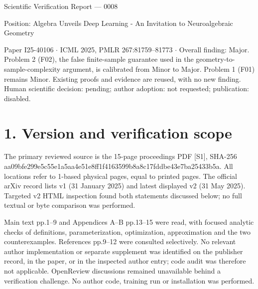 \documentclass[10pt]{article}
\begin{document}
Scientific Verification Report — 0008\par
Position: Algebra Unveils Deep Learning - An Invitation to Neuroalgebraic Geometry\par
Paper I25-40106 \(\cdot\) ICML 2025, PMLR 267:81759–81773 \(\cdot\) Overall finding: Major. Problem 2 (F02), the false finite-sample guarantee used in the geometry-to-sample-complexity argument, is calibrated from Minor to Major. Problem 1 (F01) remains Minor. Existing proofs and evidence are reused, with no new finding. Human scientific decision: pending; author adoption: not requested; publication: disabled.\par
\section*{1. Version and verification scope}
The primary reviewed source is the 15-page proceedings PDF [S1], SHA-256 aa09bfe299e5c55e1a5aa4e51e8ff1f4163599b8a8c17fddbe43e7ba25433b5a. All locations refer to 1-based physical pages, equal to printed pages. The official arXiv record lists v1 (31 January 2025) and latest displayed v2 (31 May 2025). Targeted v2 HTML inspection found both statements discussed below; no full textual or byte comparison was performed.\par
Main text pp.1–9 and Appendices A–B pp.13–15 were read, with focused analytic checks of definitions, parameterization, optimization, approximation and the two counterexamples. References pp.9–12 were consulted selectively. No relevant author implementation or separate supplement was identified on the publisher record, in the paper, or in the inspected author entry; code audit was therefore not applicable. OpenReview discussions remained unavailable behind a verification challenge. No author code, training run or installation was performed.\par
\end{document}
